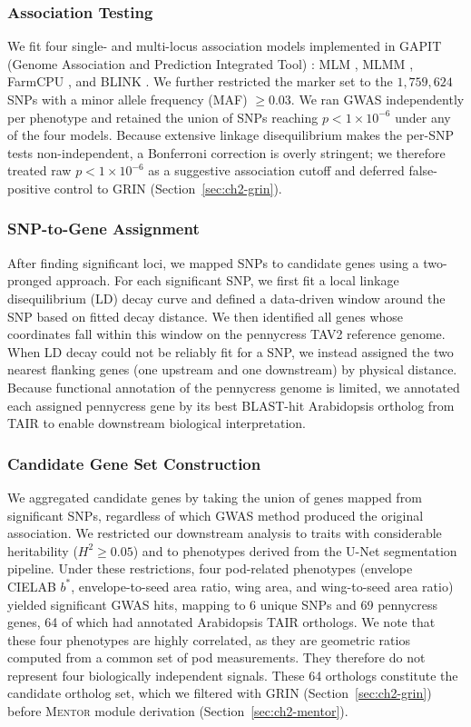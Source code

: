 \subsubsection{Association Testing}
We fit four single- and multi-locus association models implemented in GAPIT (Genome Association and Prediction Integrated Tool) \cite{wang2021gapit}: MLM \cite{yu2006mlm}, MLMM \cite{segura2012mlmm}, FarmCPU \cite{liu2016farmcpu}, and BLINK \cite{huang2019blink}. We further restricted the marker set to the $1{,}759{,}624$ SNPs with a minor allele frequency (MAF) $\geq 0.03$. We ran GWAS independently per phenotype and retained the union of SNPs reaching $p < 1\times10^{-6}$ under any of the four models. Because extensive linkage disequilibrium makes the per-SNP tests non-independent, a Bonferroni correction is overly stringent; we therefore treated raw $p < 1\times10^{-6}$ as a suggestive association cutoff and deferred false-positive control to GRIN (Section~\ref{sec:ch2-grin}).

\subsubsection{SNP-to-Gene Assignment}\label{sec:ch2-snp2gene}
After finding significant loci, we mapped SNPs to candidate genes using a two-pronged approach. For each significant SNP, we first fit a local linkage disequilibrium (LD) decay curve and defined a data-driven window around the SNP based on fitted decay distance. We then identified all genes whose coordinates fall within this window on the pennycress TAV2 reference genome. When LD decay could not be reliably fit for a SNP, we instead assigned the two nearest flanking genes (one upstream and one downstream) by physical distance. Because functional annotation of the pennycress genome is limited, we annotated each assigned pennycress gene by its best BLAST-hit Arabidopsis ortholog from TAIR \cite{garcia2002tair} to enable downstream biological interpretation.

\subsubsection{Candidate Gene Set Construction}
We aggregated candidate genes by taking the union of genes mapped from significant SNPs, regardless of which GWAS method produced the original association. We restricted our downstream analysis to traits with considerable heritability ($H^2 \geq 0.05$) and to phenotypes derived from the U-Net segmentation pipeline. Under these restrictions, four pod-related phenotypes (envelope CIELAB $b^*$, envelope-to-seed area ratio, wing area, and wing-to-seed area ratio) yielded significant GWAS hits, mapping to 6 unique SNPs and 69 pennycress genes, 64 of which had annotated Arabidopsis TAIR orthologs. We note that these four phenotypes are highly correlated, as they are geometric ratios computed from a common set of pod measurements. They therefore do not represent four biologically independent signals. These 64 orthologs constitute the candidate ortholog set, which we filtered with GRIN (Section~\ref{sec:ch2-grin}) before \textsc{Mentor} module derivation (Section~\ref{sec:ch2-mentor}).

